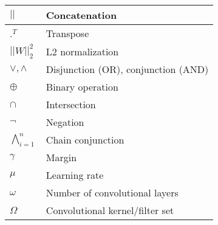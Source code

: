 \begin{center}
\begin{longtable}{|p{2cm}|p{14cm}|}
		\hline
		$||$ & Concatenation \\
		\hline
		${.}^T$ & Transpose \\
		\hline
		$|| W ||^2_2$ & L2 normalization \\
		\hline
		$\vee, \wedge$ & Disjunction (OR), conjunction (AND) \\
		\hline
		$\oplus$ & Binary operation \\
		\hline
		$\cap$ & Intersection \\
		\hline
		$\neg$ & Negation \\
		\hline
		$\bigwedge^n_{i=1}$ & Chain conjunction \\
		\hline
		$\gamma$ & Margin \\
		\hline
		$\mu$ & Learning rate \\
		\hline
		$\omega$ & Number of convolutional layers \\
		\hline
		$\Omega$ & Convolutional kernel/filter set \\
		\hline
	\end{longtable}
\end{center}

\pagebreak
